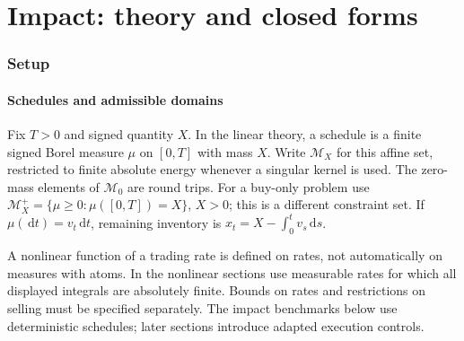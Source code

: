 \documentclass[11pt]{article}
\numberwithin{equation}{section}
\theoremstyle{definition}
\theoremstyle{remark}
\theoremstyle{definition}
\newcommand{\dd}{\,\mathrm d}
\begin{document}
\part{Impact: theory and closed forms}\label{pt:theory}
\section{Setup}\label{sec:setup}

\subsection{Schedules and admissible domains}
Fix $T>0$ and signed quantity $X$. In the linear theory, a schedule is a finite
signed Borel measure $\mu$ on $[0,T]$ with mass $X$. Write $\mathcal M_X$ for
this affine set, restricted to finite absolute energy whenever a singular kernel
is used. The zero-mass elements of $\mathcal M_0$ are round trips. For a buy-only
problem use $\mathcal M_X^+=\{\mu\geq0:\mu([0,T])=X\}$, $X>0$; this is a
different constraint set. If $\mu(\dd t)=v_t\dd t$, remaining inventory is
$x_t=X-\int_0^t v_s\dd s$.

A nonlinear function of a trading rate is defined on rates, not automatically on
measures with atoms. In the nonlinear sections use measurable rates for which
all displayed integrals are absolutely finite. Bounds on rates and restrictions
on selling must be specified separately. The impact benchmarks below use
deterministic schedules; later sections introduce adapted execution controls.
\end{document}

